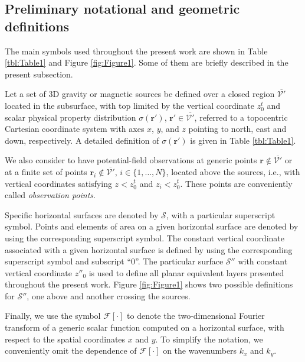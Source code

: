 \documentclass[manuscript,noblind]{geophysics}
\begin{document}
	\subsection{Preliminary notational and geometric definitions}
	\label{sec:preliminaries}
	
	The main symbols used throughout the present work are shown in Table \ref{tbl:Table1} and Figure \ref{fig:Figure1}.
	Some of them are briefly described in the present subsection.
	
	Let a set of 3D gravity or magnetic sources be defined over a closed region 
	$\overline{\mathcal{V}'}$ located in the subsurface, with top limited by the vertical coordinate $z^{t}_{0}$ 
	and scalar physical property distribution $\sigma(\mathbf{r}')$, $\mathbf{r}' \in \overline{\mathcal{V}'}$, 
	referred to a topocentric Cartesian coordinate system with axes 
	$x$, $y$, and $z$ pointing to north, east and down, respectively.
	A detailed definition of $\sigma(\mathbf{r}')$ is given in Table \ref{tbl:Table1}.
	
	We also consider to have potential-field observations at generic points 
	$\mathbf{r} \notin \overline{\mathcal{V}'}$ or at a finite set of points 
	$\mathbf{r}_{i} \notin \overline{\mathcal{V}'}$, $i \in \{ 1, \dots, N \}$, 
	located above the sources, i.e., with vertical coordinates satisfying $z < z^{t}_{0}$ and 
	$z_{i} < z^{t}_{0}$. These points are conveniently called \textit{observation points}.
	
	Specific horizontal surfaces are denoted by $\mathcal{S}$, with a particular superscript symbol. 
	Points and elements of area on a given horizontal surface are denoted by using the corresponding superscript symbol. 
	The constant vertical coordinate associated with a given horizontal surface is defined by using the 
	corresponding superscript symbol and subscript ``$0$''. 
	The particular surface $\mathcal{S}''$ with constant vertical coordinate $z''_{0}$ is used to define all
	planar equivalent layers presented throughout the present work. Figure \ref{fig:Figure1} shows two possible 
	definitions for $\mathcal{S}''$, one above and another crossing the sources.
	
	Finally, we use the symbol $\mathcal{F} [ \cdot ]$ to denote the two-dimensional Fourier transform of a generic scalar 
	function computed on a horizontal surface, with respect to the spatial coordinates $x$ and $y$. 
	To simplify the notation, we conveniently omit the dependence of $\mathcal{F} [ \cdot ]$ on the 
	wavenumbers $k_{x}$ and $k_{y}$.
	
\end{document}
